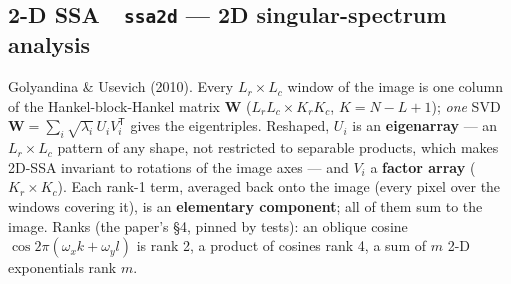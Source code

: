 \documentclass[10pt]{article}
\newcommand{\dev}[1]{\texttt{#1}}
\newcommand{\tool}[2]{#1~\textperiodcentered~\dev{#2}}
\begin{document}
\subsection{\tool{2-D SSA}{ssa2d} --- 2D singular-spectrum analysis}
Golyandina \& Usevich (2010). Every $L_r\times L_c$ window of the image is one column of the
Hankel-block-Hankel matrix $\mathbf W$ ($L_rL_c\times K_rK_c$, $K=N-L+1$); \emph{one} SVD
$\mathbf W=\sum_i\sqrt{\lambda_i}\,U_iV_i^{\mathsf T}$ gives the eigentriples. Reshaped, $U_i$
is an \textbf{eigenarray} --- an $L_r\times L_c$ pattern of any shape, not restricted to
separable products, which makes 2D-SSA invariant to rotations of the image axes --- and $V_i$ a
\textbf{factor array} ($K_r\times K_c$). Each rank-1 term, averaged back onto the image (every
pixel over the windows covering it), is an \textbf{elementary component}; all of them sum to
the image. Ranks (the paper's \S4, pinned by tests): an oblique cosine
$\cos 2\pi(\omega_xk+\omega_yl)$ is rank 2, a product of cosines rank 4, a sum of $m$ 2-D
exponentials rank $m$.
\end{document}
